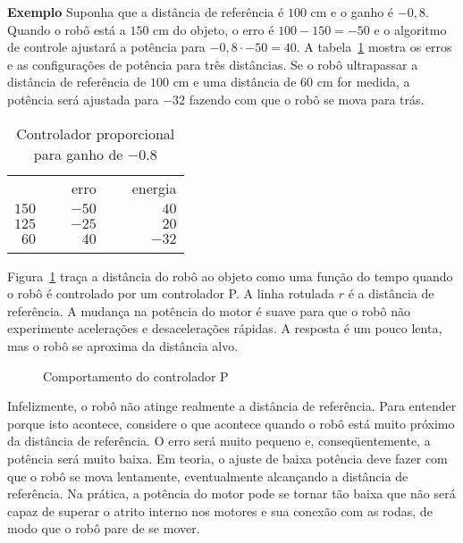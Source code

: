 \smallskip

\noindent\textbf{Exemplo} Suponha que a distância de referência é $100$ cm e o ganho é $-0,8$. Quando o robô está a $150$ cm do objeto, o erro é $100-150=-50$ e o algoritmo de controle ajustará a potência para $-0,8\cdot -50=40$. A tabela~\ref{tab.p-controller} mostra os erros e as configurações de potência para três distâncias. Se o robô ultrapassar a distância de referência de $100$ cm e uma distância de $60$ cm for medida, a potência será ajustada para $-32$ fazendo com que o robô se mova para trás.

\begin{table}
\caption{Controlador proporcional para ganho de $-0.8$}
\label{tab.p-controller}
\begin{tabular}{rrr}
\hline\noalign{\smallskip}
\multicolumn{1}{c}{distância} & \multicolumn{1}{c}{\ \ \ erro}& \multicolumn{1}{c}{\ \ \ energia}\\
\noalign{\smallskip}\hline\noalign{\smallskip}
$150$ & $-50$ & $40$\\
$125$ & $-25$ & $20$\\
$60$ & $40$ & $-32$\\
\noalign{\smallskip}\hline\noalign{\smallskip}
\end{tabular}
\end{table}

Figura~\ref{fig.p-control} traça a distância do robô ao objeto como uma função do tempo quando o robô é controlado por um controlador P. A linha rotulada $r$ é a distância de referência. A mudança na potência do motor é suave para que o robô não experimente acelerações e desacelerações rápidas. A resposta é um pouco lenta, mas o robô se aproxima da distância alvo.

\begin{figure}
\begin{center}
\caption{Comportamento do controlador P}\label{fig.p-control}
\end{center}
\end{figure}

Infelizmente, o robô não atinge realmente a distância de referência. Para entender porque isto acontece, considere o que acontece quando o robô está muito próximo da distância de referência. O erro será muito pequeno e, conseqüentemente, a potência será muito baixa. Em teoria, o ajuste de baixa potência deve fazer com que o robô se mova lentamente, eventualmente alcançando a distância de referência. Na prática, a potência do motor pode se tornar tão baixa que não será capaz de superar o atrito interno nos motores e sua conexão com as rodas, de modo que o robô pare de se mover.

